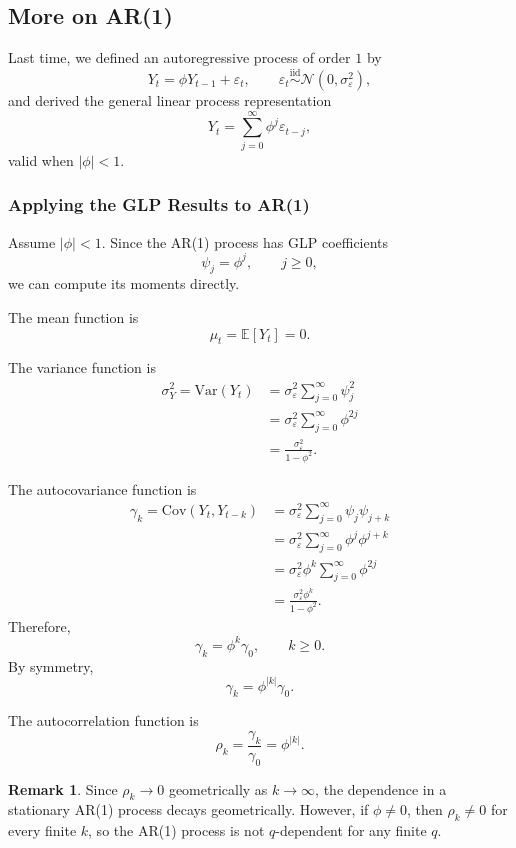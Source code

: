 \documentclass[12pt,oneside]{book}
\numberwithin{equation}{section}
\theoremstyle{definition}
\newtheorem{remark}{Remark}[section]
\theoremstyle{plain}
\theoremstyle{remark}
\newcommand{\E}{\mathbb{E}}
\newcommand{\Var}{\mathrm{Var}}
\newcommand{\Cov}{\mathrm{Cov}}
\newcommand{\iid}{\overset{\text{iid}}{\sim}}
\newcommand{\Normal}{\mathcal{N}}
\begin{document}
\subsection*{More on AR(1)}

Last time, we defined an autoregressive process of order $1$ by
\[
Y_t=\phi Y_{t-1}+\varepsilon_t,
\qquad
\varepsilon_t \iid \Normal(0,\sigma_\varepsilon^2),
\]
and derived the general linear process representation
\[
Y_t=\sum_{j=0}^{\infty}\phi^j\varepsilon_{t-j},
\]
valid when $|\phi|<1$.

\subsubsection*{Applying the GLP Results to AR(1)}

Assume $|\phi|<1$. Since the AR(1) process has GLP coefficients
\[
\psi_j=\phi^j,
\qquad j\geq 0,
\]
we can compute its moments directly.

The mean function is
\[
\mu_t=\E[Y_t]=0.
\]

The variance function is
\begin{align*}
\sigma_Y^2
=
\Var(Y_t)
&=
\sigma_\varepsilon^2\sum_{j=0}^{\infty}\psi_j^2 \\
&=
\sigma_\varepsilon^2\sum_{j=0}^{\infty}\phi^{2j} \\
&=
\frac{\sigma_\varepsilon^2}{1-\phi^2}.
\end{align*}

The autocovariance function is
\begin{align*}
\gamma_k
=
\Cov(Y_t,Y_{t-k})
&=
\sigma_\varepsilon^2\sum_{j=0}^{\infty}\psi_j\psi_{j+k} \\
&=
\sigma_\varepsilon^2\sum_{j=0}^{\infty}\phi^j\phi^{j+k} \\
&=
\sigma_\varepsilon^2\phi^k\sum_{j=0}^{\infty}\phi^{2j} \\
&=
\frac{\sigma_\varepsilon^2\phi^k}{1-\phi^2}.
\end{align*}
Therefore,
\[
\gamma_k=\phi^k\gamma_0,
\qquad k\geq 0.
\]
By symmetry,
\[
\gamma_k=\phi^{|k|}\gamma_0.
\]

The autocorrelation function is
\[
\rho_k=\frac{\gamma_k}{\gamma_0}=\phi^{|k|}.
\]

\begin{remark}
Since $\rho_k\to 0$ geometrically as $k\to\infty$, the dependence in a stationary AR(1) process decays geometrically. However, if $\phi\neq 0$, then $\rho_k\neq 0$ for every finite $k$, so the AR(1) process is not $q$-dependent for any finite $q$.
\end{remark}
\end{document}
